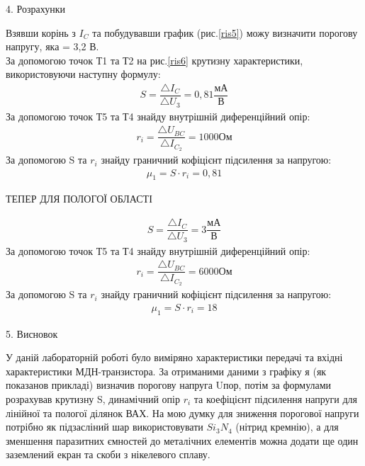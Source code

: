 \documentclass[a4paper,14pt]{extreport}
\begin{document}
\newpage
\clearpage

\begin{center}4. Розрахунки\\ \end{center}

Взявши корінь з $I_C$  та побудувавши график (рис.\ref{ris5}) можу визначити порогову напругу, яка = 3,2 В.\\
За допомогою точок Т1 та Т2 на рис.\ref{ris6} крутизну характеристики, використовуючи наступну формулу:
\begin{align}\label{q1}
  S = \dfrac{\triangle I_C}{\triangle U_{\text{3}}} = 0,81 \dfrac{\text{мА}}{\text{В}}
\end{align}
За допомогою точок Т5 та Т4 знайду внутрішній диференційний опір:
\begin{align}\label{q2}
  r_i = \dfrac{\triangle U_{BC}}{\triangle I_{C_2}} = 1000 \text{Ом}
\end{align}
За допомогою S та $r_i$ знайду граничний кофіцієнт підсилення за напругою:
\begin{align}\label{q3}
  \mu_1 = S\cdot r_i = 0,81
\end{align}

\begin{center} ТЕПЕР ДЛЯ ПОЛОГОЇ ОБЛАСТІ \end{center}

\begin{align}\label{q4}
  S = \dfrac{\triangle I_C}{\triangle U_{\text{3}}} = 3 \dfrac{\text{мА}}{\text{В}}
\end{align}
За допомогою точок Т5 та Т4 знайду внутрішній диференційний опір:
\begin{align}\label{q5}
  r_i = \dfrac{\triangle U_{BC}}{\triangle I_{C_2}} = 6000 \text{Ом}
\end{align}
За допомогою S та $r_i$ знайду граничний кофіцієнт підсилення за напругою:
\begin{align}\label{q6}
  \mu_1 = S\cdot r_i = 18
\end{align}





















\begin{center}5. Висновок\\ \end{center}

У даній лабораторній роботі було виміряно характеристики передачі та
вхідні характеристики МДН-транзистора. За отриманими
даними з графіку я (як показанов прикладі) визначив порогову напруга Uпор, потім за формулами розрахував крутизну
S, динамічний опір $r_i$ та коефіцієнт підсилення напруги для
лінійної та пологої ділянок ВАХ. На мою думку для зниження порогової напруги потрібно як підзасліний шар
використовувати $Si_3N_4$ (нітрид кремнію), а для зменшення паразитних ємностей до металічних елементів можна додати
ще один заземлений екран та скоби з нікелевого сплаву.
\end{document}
